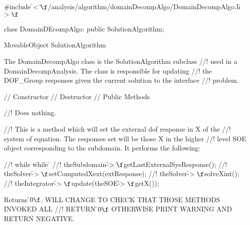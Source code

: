 
\indent \#include \f$<\tilde{
}\f$/analysis/algorithm/domainDecompAlgo/DomainDecompAlgo.h\f$>\f$  

\indent class DomainDEcompAlgo: public SolutionAlgorithm;

\indent MovableObject
\indent\indent SolutionAlgorithm
\indent\indent{}

\indent The DomainDecompAlgo class is the SolutionAlgorithm subclass
//! used in a DomainDecompAnalysis. The class is responsible for updating
//! the DOF\_Group responses given the current solution to the interface
//! problem. 

\indent\indent // Constructor 
\indent{}
\indent\indent // Destructor
\indent{}
\indent\indent // Public Methods
\indent{}
\indent{}
\indent{}
\indent{}



//! Does nothing.

//! This is a method which will set the external dof response in X of the
//! system of equation. The responses set will be those X in the higher
//! level SOE object corresponding to the subdomain. It performs the following:
\begin{tabbing}
//! while \= while \= \+ \kill
//! theSubdomain-\f$>\f$getLastExternalSysResponse();
//! theSolver-\f$>\f$setComputedXext(extResponse);
//! theSolver-\f$>\f$solveXint();
//! theIntegrator-\f$>\f$update(theSOE-\f$>\f$getX()); 
\end{tabbing}
\noindent Returns \f$0\f$. WILL CHANGE TO CHECK THAT THOSE METHODS INVOKED ALL
//! RETURN \f$0\f$ OTHERWISE PRINT WARNING AND RETURN NEGATIVE.

